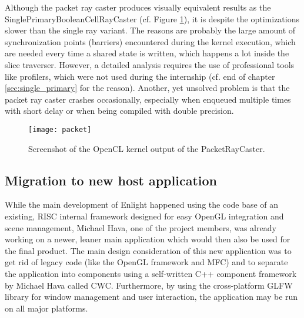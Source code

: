 Although the packet ray caster produces visually equivalent results as the SinglePrimaryBooleanCellRayCaster (cf. Figure \ref{fig:packet}), it is despite the optimizations slower than the single ray variant. The reasons are probably the large amount of synchronization points (barriers) encountered during the kernel execution, which are needed every time a shared state is written, which happens a lot inside the slice traverser. However, a detailed analysis requires the use of professional tools like profilers, which were not used during the internship (cf. end of chapter \ref{sec:single_primary} for the reason). Another, yet unsolved problem is that the packet ray caster crashes occasionally, especially when enqueued multiple times with short delay or when being compiled with double precision.


\begin{figure}
\centering
\texttt{[image: packet]}
\caption{Screenshot of the OpenCL kernel output of the PacketRayCaster.}
\label{fig:packet}
\end{figure}

\subsection{Migration to new host application}
\label{sec:migration}

While the main development of Enlight happened using the code base of an existing, RISC internal framework designed for easy OpenGL integration and scene management, Michael Hava, one of the project members, was already working on a newer, leaner main application which would then also be used for the final product. The main design consideration of this new application was to get rid of legacy code (like the OpenGL framework and MFC) and to separate the application into components using a self-written C++ component framework by Michael Hava called CWC. Furthermore, by using the cross-platform GLFW library for window management and user interaction, the application may be run on all major platforms.


